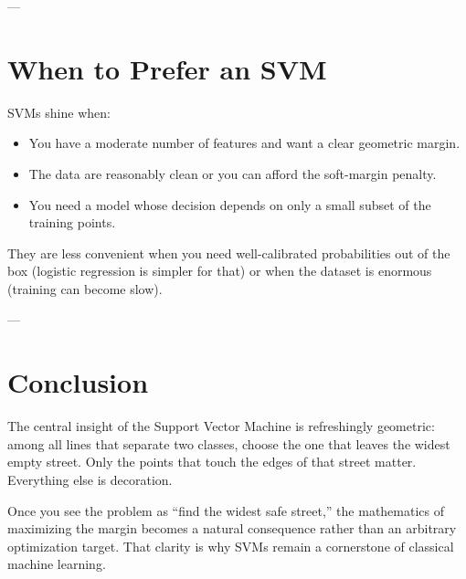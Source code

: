 \documentclass[11pt,journal,onecolumn]{IEEEtran}
\begin{document}
---

\section{When to Prefer an SVM}
\label{sec:when}

SVMs shine when:
\begin{itemize}
    \item You have a moderate number of features and want a clear geometric margin.
    \item The data are reasonably clean or you can afford the soft-margin penalty.
    \item You need a model whose decision depends on only a small subset of the training points.
\end{itemize}

They are less convenient when you need well-calibrated probabilities out of the box (logistic regression is simpler for that) or when the dataset is enormous (training can become slow).

---

\section{Conclusion}
\label{sec:conclusion}

The central insight of the Support Vector Machine is refreshingly geometric: among all lines that separate two classes, choose the one that leaves the widest empty street. Only the points that touch the edges of that street matter. Everything else is decoration.

Once you see the problem as “find the widest safe street,” the mathematics of maximizing the margin becomes a natural consequence rather than an arbitrary optimization target. That clarity is why SVMs remain a cornerstone of classical machine learning.
\end{document}
